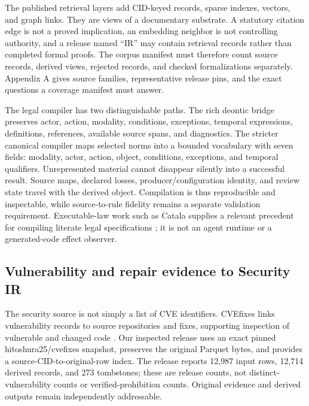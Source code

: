 \documentclass{article}
\begin{document}
The published retrieval layers add CID-keyed records, sparse indexes, vectors, and graph links. They are views of a documentary substrate. A statutory citation edge is not a proved implication, an embedding neighbor is not controlling authority, and a release named ``IR'' may contain retrieval records rather than completed formal proofs. The corpus manifest must therefore count source records, derived views, rejected records, and checked formalizations separately. Appendix A gives source families, representative release pins, and the exact questions a coverage manifest must answer.

The legal compiler has two distinguishable paths. The rich deontic bridge preserves actor, action, modality, conditions, exceptions, temporal expressions, definitions, references, available source spans, and diagnostics. The stricter canonical compiler maps selected norms into a bounded vocabulary with seven fields: modality, actor, action, object, conditions, exceptions, and temporal qualifiers. Unrepresented material cannot disappear silently into a successful result. Source maps, declared losses, producer/configuration identity, and review state travel with the derived object. Compilation is thus reproducible and inspectable, while source-to-rule fidelity remains a separate validation requirement. Executable-law work such as Catala supplies a relevant precedent for compiling literate legal specifications \citep{catala}; it is not an agent runtime or a generated-code effect observer.

\subsection{Vulnerability and repair evidence to Security IR}

The security source is not simply a list of CVE identifiers. CVEfixes links vulnerability records to source repositories and fixes, supporting inspection of vulnerable and changed code \citep{cvefixes}. Our inspected release uses an exact pinned hitoshura25/cvefixes snapshot, preserves the original Parquet bytes, and provides a source-CID-to-original-row index. The release reports 12,987 input rows, 12,714 derived records, and 273 tombstones; these are release counts, not distinct-vulnerability counts or verified-prohibition counts. Original evidence and derived outputs remain independently addressable.
\end{document}
